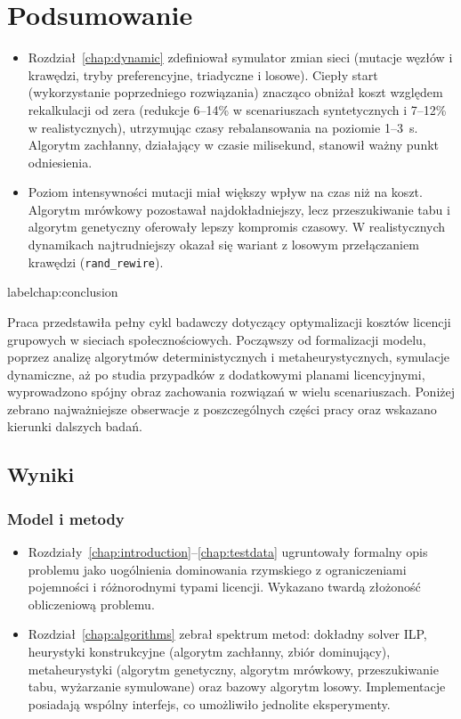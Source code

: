\chapter{Podsumowanie}
\begin{itemize}
  \item Rozdział~\ref{chap:dynamic} zdefiniował symulator zmian sieci (mutacje węzłów i krawędzi, tryby preferencyjne, triadyczne i losowe). Ciepły start (wykorzystanie poprzedniego rozwiązania) znacząco obniżał koszt względem rekalkulacji od zera (redukcje 6--14\% w scenariuszach syntetycznych i 7--12\% w realistycznych), utrzymując czasy rebalansowania na poziomie 1--3~s. Algorytm zachłanny, działający w czasie milisekund, stanowił ważny punkt odniesienia.
  \item Poziom intensywności mutacji miał większy wpływ na czas niż na koszt. Algorytm mrówkowy pozostawał najdokładniejszy, lecz przeszukiwanie tabu i algorytm genetyczny oferowały lepszy kompromis czasowy. W realistycznych dynamikach najtrudniejszy okazał się wariant z losowym przełączaniem krawędzi (\texttt{rand\_rewire}).
\end{itemize}label{chap:conclusion}

Praca przedstawiła pełny cykl badawczy dotyczący optymalizacji kosztów licencji grupowych w sieciach społecznościowych. Począwszy od formalizacji modelu, poprzez analizę algorytmów deterministycznych i metaheurystycznych, symulacje dynamiczne, aż po studia przypadków z dodatkowymi planami licencyjnymi, wyprowadzono spójny obraz zachowania rozwiązań w wielu scenariuszach. Poniżej zebrano najważniejsze obserwacje z poszczególnych części pracy oraz wskazano kierunki dalszych badań.

\section{Wyniki}

\subsection*{Model i metody}
\begin{itemize}
  \item Rozdziały~\ref{chap:introduction}--\ref{chap:testdata} ugruntowały formalny opis problemu jako uogólnienia dominowania rzymskiego z ograniczeniami pojemności i różnorodnymi typami licencji. Wykazano twardą złożoność obliczeniową problemu.
  \item Rozdział~\ref{chap:algorithms} zebrał spektrum metod: dokładny solver ILP, heurystyki konstrukcyjne (algorytm zachłanny, zbiór dominujący), metaheurystyki (algorytm genetyczny, algorytm mrówkowy, przeszukiwanie tabu, wyżarzanie symulowane) oraz bazowy algorytm losowy. Implementacje posiadają wspólny interfejs, co umożliwiło jednolite eksperymenty.
\end{itemize}

